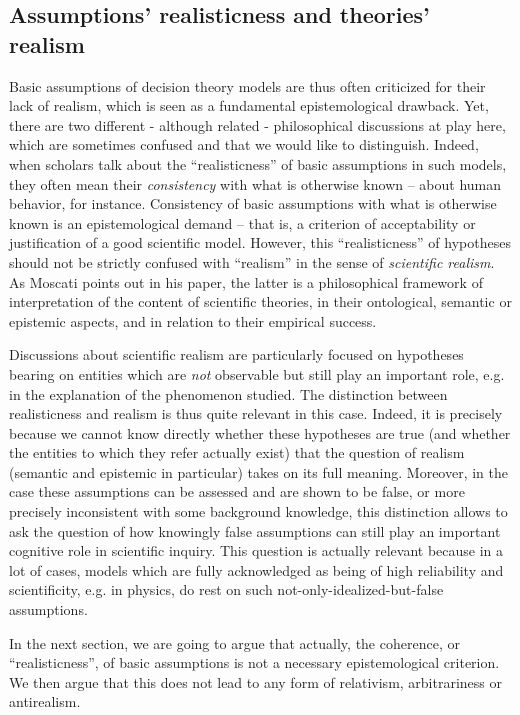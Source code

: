 \documentclass[a4paper,11pt]{article}
\begin{document}
\subsection{Assumptions' realisticness and theories' realism}
Basic assumptions of decision theory models are thus often criticized for their lack of realism, which is seen as a fundamental epistemological drawback. Yet, there are two different - although related - philosophical discussions at play here, which are sometimes confused and that we would like to distinguish. Indeed, when scholars talk about the ``realisticness'' of basic assumptions in such models, they often mean their \textit{consistency} with what is otherwise known -- about human behavior, for instance. Consistency of basic assumptions with what is otherwise known is an epistemological demand -- that is, a criterion of acceptability or justification of a good scientific model. However, this ``realisticness'' of hypotheses should not be strictly confused with ``realism'' in the sense of \textit{scientific realism}. As Moscati points out in his paper, the latter is a philosophical framework of interpretation of the content of scientific theories, in their ontological, semantic or epistemic aspects, and in relation to their empirical success. 

Discussions about scientific realism are particularly focused on hypotheses bearing on entities which are \textit{not} observable but still play an important role, e.g. in the explanation of the phenomenon studied. The distinction between realisticness and realism is thus quite relevant in this case. Indeed, it is precisely because we cannot know directly whether these hypotheses are true (and whether the entities to which they refer actually exist) that the question of realism (semantic and epistemic in particular) takes on its full meaning. Moreover, in the case these assumptions can be assessed and are shown to be false, or more precisely inconsistent with some background knowledge, this distinction allows to ask the question of how knowingly false assumptions can still play an important cognitive role in scientific inquiry. This question is actually relevant because in a lot of cases, models which are fully acknowledged as being of high reliability and scientificity, e.g. in physics, do rest on such not-only-idealized-but-false assumptions. 

In the next section, we are going to argue that actually, the coherence, or ``realisticness'', of basic assumptions is not a necessary epistemological criterion. We then argue that this does not lead to any form of relativism, arbitrariness or antirealism. 
\end{document}
